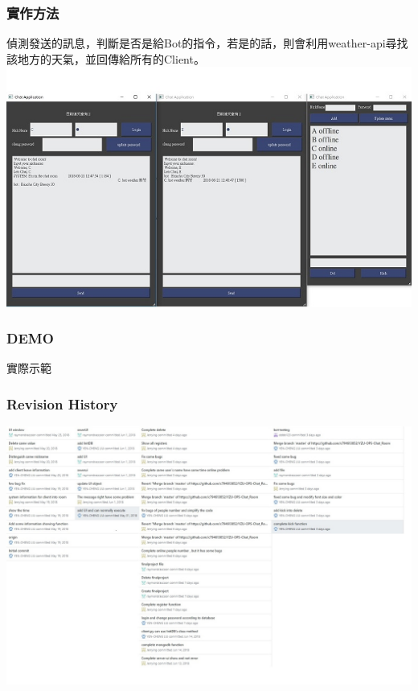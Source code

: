 \documentclass[utf8x]{beamer}
\begin{document}
\begin{frame}[t]
\vspace{1.5em}
\frametitle{\LARGE 實作方法} %
\hspace{2em} \Large 偵測發送的訊息，判斷是否是給Bot的指令，若是的話，則會利用weather-api尋找該地方的天氣，並回傳給所有的Client。
\vspace{6em}
\hspace{4em} \includegraphics[scale=0.4]{figure1}
\end{frame}


\begin{frame}
\frametitle{\LARGE DEMO} %
\centerline{\LARGE 實際示範}
\end{frame}
\begin{frame}[t]
\frametitle{\huge Revision History} %
\includegraphics[scale=0.3]{history}
\end{frame}
\end{document}
